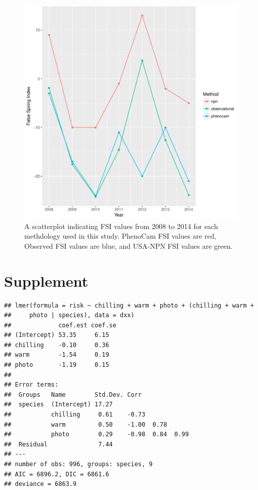 \documentclass{article}\usepackage[]{graphicx}\usepackage[]{color}
\makeatletter
\def\maxwidth{ %
  \ifdim\Gin@nat@width>\linewidth
    \linewidth
  \else
    \Gin@nat@width
  \fi
}
\newenvironment{kframe}{%
 \def\at@end@of@kframe{}%
 \ifinner\ifhmode%
  \def\at@end@of@kframe{\end{minipage}}%
  \begin{minipage}{\columnwidth}%
 \fi\fi%
 \def\FrameCommand##1{\hskip\@totalleftmargin \hskip-\fboxsep
 \colorbox{shadecolor}{##1}\hskip-\fboxsep
     \hskip-\linewidth \hskip-\@totalleftmargin \hskip\columnwidth}%
 \MakeFramed {\advance\hsize-\width
   \@totalleftmargin\z@ \linewidth\hsize
   \@setminipage}}%
 {\par\unskip\endMakeFramed%
 \at@end@of@kframe}
\newenvironment{knitrout}{}{} %
\makeatother
\begin{document}
\begin{figure}[H]
\includegraphics[width=\maxwidth]{figure/fsifig-1} \caption[A scatterplot indicating FSI values from 2008 to 2014 for each methdology used in this study]{A scatterplot indicating FSI values from 2008 to 2014 for each methdology used in this study. PhenoCam FSI values are red, Observed FSI values are blue, and USA-NPN FSI values are green.}\label{fig:fsifig}
\end{figure}




\section*{Supplement}
\begin{knitrout}
\color{fgcolor}\begin{kframe}
\begin{verbatim}
## lmer(formula = risk ~ chilling + warm + photo + (chilling + warm + 
##     photo | species), data = dxx)
##             coef.est coef.se
## (Intercept) 53.35     6.15  
## chilling    -0.10     0.36  
## warm        -1.54     0.19  
## photo       -1.19     0.15  
## 
## Error terms:
##  Groups   Name        Std.Dev. Corr              
##  species  (Intercept) 17.27                      
##           chilling     0.61    -0.73             
##           warm         0.50    -1.00  0.78       
##           photo        0.29    -0.98  0.84  0.99 
##  Residual              7.44                      
## ---
## number of obs: 996, groups: species, 9
## AIC = 6896.2, DIC = 6861.6
## deviance = 6863.9
\end{verbatim}
\end{kframe}
\end{knitrout}
\end{document}
